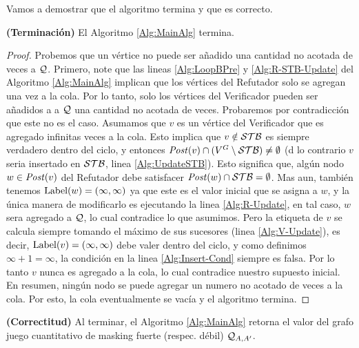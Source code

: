 	 Vamos a demostrar que el algoritmo termina y que es correcto.

\sloppy \begin{theorem}\label{thm:alg-termination}  \textbf{(Terminación)} El Algoritmo \ref{Alg:MainAlg} termina.
\end{theorem}
\begin{proof}
Probemos que un vértice no puede ser añadido una cantidad no acotada de veces a $\mathcal{Q}$. 
Primero, note que las lineas \ref{Alg:LoopBPre} y \ref{Alg:R-STB-Update} del Algoritmo  \ref{Alg:MainAlg} implican que los vértices del Refutador solo se agregan una vez a la cola. 
Por lo tanto, solo los vértices del Verificador pueden ser añadidos a a $\mathcal{Q}$ una cantidad no acotada de veces.
Probaremos por contradicción que este no es el caso. 
Asumamos que $v$ es un vértice del Verificador que es agregado infinitas veces a la cola. 
Esto implica que $v \notin \mathcal{STB}$ es siempre verdadero dentro del ciclo, y entonces 
$\mathit{Post}(v) \cap (V^G \setminus \mathcal{STB}) \neq \emptyset$ (d lo contrario $v$ seria insertado en $\mathcal{STB}$, linea \ref{Alg:UpdateSTB}). 
Esto significa que,  algún nodo $w \in \mathit{Post}(v)$ del Refutador debe satisfacer $\mathit{Post}(w) \cap \mathcal{STB} = \emptyset$. 
Mas aun, también tenemos $\operatorname{Label}(w) = (\infty, \infty)$ ya que este es el valor inicial que se asigna a $w$, 
y la única manera de modificarlo es ejecutando la linea \ref{Alg:R-Update}, 
en tal caso, $w$ sera agregado a $\mathcal{Q}$, lo cual contradice lo que asumimos. 
Pero la etiqueta de $v$ se calcula siempre tomando el máximo de sus sucesores (linea \ref{Alg:V-Update}), es decir, 
$\operatorname{Label}(v) = (\infty, \infty)$ debe valer dentro del ciclo, y como definimos $\infty + 1 = \infty$, la condición en la linea \ref{Alg:Insert-Cond} siempre es falsa.
Por lo tanto $v$ nunca es agregado a la cola, lo cual contradice nuestro supuesto inicial. 
En resumen, ningún nodo se puede agregar un numero no acotado de veces a la cola. Por esto, 
la cola eventualmente se vacía y el algoritmo termina.
\qedhere
\end{proof} 
\sloppy \begin{theorem}\label{thm:alg-correctness} \textbf{(Correctitud)} Al terminar, el Algoritmo \ref{Alg:MainAlg} 
retorna el valor del grafo juego cuantitativo de masking fuerte (respec. débil) $\mathcal{Q}_{A, A'}$.
\end{theorem}
